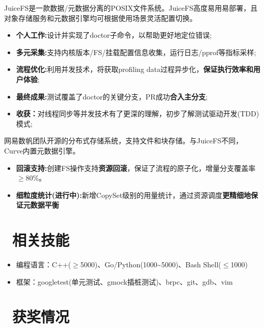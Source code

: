 \documentclass{resume}
\begin{document}
JuiceFS是一款数据/元数据分离的POSIX文件系统。JuiceFS高度易用易部署，且对象存储服务和元数据引擎均可根据使用场景灵活配置切换。
\begin{itemize}[parsep=0.3ex]
  \item \textbf{个人工作:}设计并实现了doctor子命令，以帮助更好地定位错误;
  \item \textbf{多元采集:}支持内核版本/FS/挂载配置信息收集，运行日志/pprof等指标采样;
  \item \textbf{流程优化:}利用并发技术，将获取profiling data过程异步化，\textbf{保证执行效率和用户体验};
  \item \textbf{最终成果:}测试覆盖了doctor的关键分支，PR成功\textbf{合入主分支};\enspace{}
  \item \textbf{收获：}对线程同步等并发技术有了更深的理解，初步了解测试驱动开发(TDD)模式;
\end{itemize}
网易数帆团队开源的分布式存储系统，支持文件和块存储。与JuiceFS不同，Curve内置元数据引擎。
\begin{itemize}[parsep=0.3ex]
  \item \textbf{回滚支持:}创建FS操作支持\textbf{资源回滚}，保证了流程的原子化，增量分支覆盖率$\geq$80\%。
  \item \textbf{细粒度统计(进行中):}新增CopySet级别的用量统计，通过资源调度\textbf{更精细地保证元数据平衡}
\end{itemize}
\section{\faCogs\ 相关技能}
\begin{itemize}[parsep=0.5ex]
  \item 编程语言：C++($\geq${5000})、Go/Python(1000\textasciitilde5000)、Bash Shell($\leq$1000)
  \item 框架：googletest(单元测试、gmock插桩测试)、brpc、git、gdb、vim
\end{itemize}
\section{\faHeartO\ 获奖情况}
\end{document}
